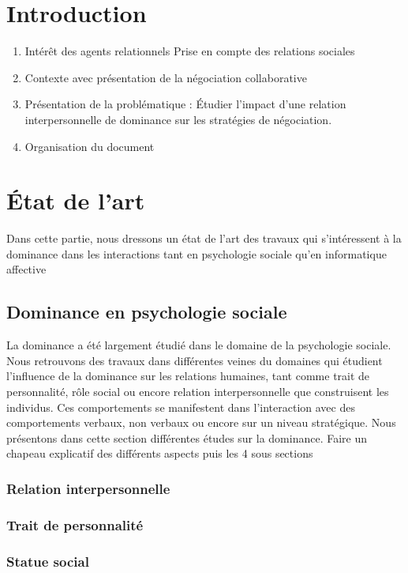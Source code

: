 \documentclass [french]{article}
\begin{document}
	
	\section{Introduction}
		\begin{enumerate}
			\item Intérêt des agents relationnels 
			\subitem Prise en compte des relations sociales
			\item Contexte avec présentation de la négociation collaborative
			\item Présentation de la problématique : Étudier l'impact d'une relation interpersonnelle de dominance sur les stratégies de négociation.
				\subitem 
			\item Organisation du document
		\end{enumerate}
		
		
	\section{État de l'art}
	Dans cette partie, nous dressons un état de l'art des travaux qui s'intéressent à la dominance dans les interactions tant en psychologie sociale qu'en informatique affective 
		\subsection{Dominance en psychologie sociale}
			La dominance a été largement étudié dans le domaine de la psychologie sociale. Nous retrouvons des travaux dans différentes veines du domaines qui étudient l'influence de la dominance sur les relations humaines, tant comme trait de personnalité, rôle social ou encore relation interpersonnelle que construisent les individus. Ces comportements se manifestent dans l'interaction avec des comportements verbaux, non verbaux ou encore sur un niveau stratégique.		
			Nous présentons dans cette section différentes études sur la dominance.
			Faire un chapeau explicatif des différents aspects puis les 4 sous sections
			
			\subsubsection{Relation interpersonnelle}
			\label{ri}
			\subsubsection{Trait de personnalité}
			\label{perso}
			\subsubsection{Statue social}
\end{document}
